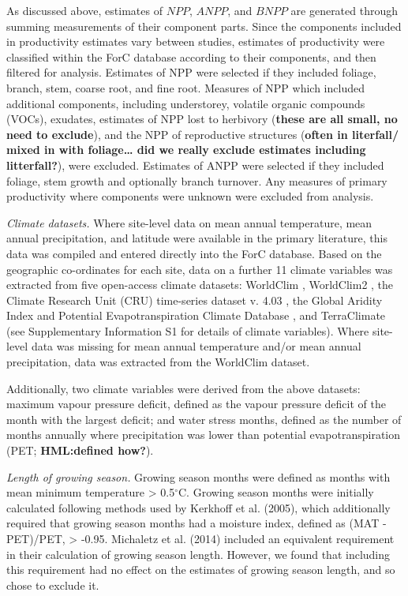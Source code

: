 \documentclass[]{article}
\begin{document}
As discussed above, estimates of \(NPP\), \(ANPP\), and \(BNPP\) are
generated through summing measurements of their component parts. Since
the components included in productivity estimates vary between studies,
estimates of productivity were classified within the ForC database
according to their components, and then filtered for analysis. Estimates
of NPP were selected if they included foliage, branch, stem, coarse
root, and fine root. Measures of NPP which included additional
components, including understorey, volatile organic compounds (VOCs),
exudates, estimates of NPP lost to herbivory (\textbf{these are all
small, no need to exclude}), and the NPP of reproductive structures
(\textbf{often in literfall/ mixed in with foliage\ldots{} did we really
exclude estimates including litterfall?}), were excluded. Estimates of
ANPP were selected if they included foliage, stem growth and optionally
branch turnover. Any measures of primary productivity where components
were unknown were excluded from analysis.

\emph{Climate datasets.} Where site-level data on mean annual
temperature, mean annual precipitation, and latitude were available in
the primary literature, this data was compiled and entered directly into
the ForC database. Based on the geographic co-ordinates for each site,
data on a further 11 climate variables was extracted from five
open-access climate datasets: WorldClim \citep{hijmans_very_2005},
WorldClim2 \citep{fick_worldclim_2017}, the Climate Research Unit (CRU)
time-series dataset v. 4.03 \citep{harris_updated_2014}, the Global
Aridity Index and Potential Evapotranspiration Climate Database
\citep{trabucco_global_2018}, and TerraClimate
\citep{abatzoglou_terraclimate_2018} (see Supplementary Information S1
for details of climate variables). Where site-level data was missing for
mean annual temperature and/or mean annual precipitation, data was
extracted from the WorldClim dataset.

Additionally, two climate variables were derived from the above
datasets: maximum vapour pressure deficit, defined as the vapour
pressure deficit of the month with the largest deficit; and water stress
months, defined as the number of months annually where precipitation was
lower than potential evapotranspiration (PET; \textbf{HML:defined
how?}).

\emph{Length of growing season.} Growing season months were defined as
months with mean minimum temperature \textgreater{} 0.5\(^\circ\)C.
Growing season months were initially calculated following methods used
by Kerkhoff et al. (2005), which additionally required that growing
season months had a moisture index, defined as (MAT - PET)/PET,
\textgreater{} -0.95. Michaletz et al. (2014) included an equivalent
requirement in their calculation of growing season length. However, we
found that including this requirement had no effect on the estimates of
growing season length, and so chose to exclude it.
\end{document}

